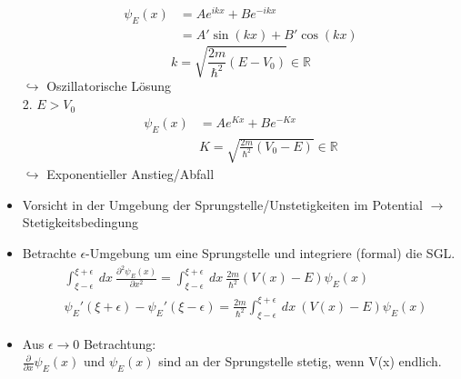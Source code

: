 \documentclass[10pt,article,colorback,accentcolor=tud9d]{scrartcl}
\begin{document}
\begin{itemize}
    \begin{align}
    \psi_E(x)&=Ae^{ikx}+Be^{-ikx}\\
    &=A'\sin(kx)+B'\cos(kx)
    \end{align}
    \begin{equation}
    k=\sqrt{\frac{2m}{\hbar^2}(E-V_0)} \in \mathbb{R}
    \end{equation}
    $\hookrightarrow$ Oszillatorische Lösung\\
    2. $E>V_0$
    \begin{align}
    \psi_E(x)&=Ae^{K x}+Be^{-K x}\\
    &K=\sqrt{\frac{2m}{\hbar^2}(V_0-E)}\in \mathbb{R}
    \end{align}
    $\hookrightarrow$ Exponentieller Anstieg/Abfall
  \item Vorsicht in der Umgebung der Sprungstelle/Unstetigkeiten im Potential $\rightarrow$ Stetigkeitsbedingung
  \item Betrachte $\epsilon$-Umgebung um eine Sprungstelle und integriere (formal) die SGL.
    \begin{align}
    &\int_{\xi-\epsilon}^{\xi+\epsilon}\ dx \ \frac{\partial^2\psi_E(x)}{\partial x^2}=\int_{\xi-\epsilon}^{\xi+\epsilon}\ dx \ \frac{2m}{\hbar^2}(V(x)-E)\psi_E(x)\\
    &\psi_E'(\xi+\epsilon)-\psi_E'(\xi-\epsilon)=\frac{2m}{\hbar^2} \int_{\xi-\epsilon}^{\xi+\epsilon}\ dx \ (V(x)-E) \psi_E(x)
    \end{align}
  \item Aus $\epsilon\rightarrow 0$ Betrachtung:\\
    $\frac{\partial}{\partial x}\psi_E(x)$ und $\psi_E(x)$ sind an der Sprungstelle stetig, wenn V(x) endlich.
\end{itemize}
\end{document}
